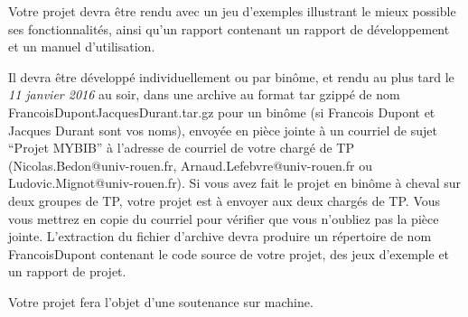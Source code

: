 \documentclass[10pt,a4wide,draft]{article}
\begin{document}
Votre projet devra être rendu avec un jeu d'exemples illustrant le mieux possible ses fonctionnalités, ainsi qu'un rapport contenant un rapport de développement et un manuel d'utilisation.

Il devra être développé individuellement ou par binôme, et rendu au plus tard le \emph{11 janvier 2016} au soir, dans une archive au format tar gzippé de nom FrancoisDupontJacquesDurant.tar.gz pour un binôme (si Francois Dupont et Jacques Durant sont vos noms), envoyée en pièce jointe à un courriel de sujet ``Projet MYBIB'' à l'adresse de courriel de votre chargé de TP (Nicolas.Bedon@univ-rouen.fr, Arnaud.Lefebvre@univ-rouen.fr ou Ludovic.Mignot@univ-rouen.fr). Si vous avez fait le projet en binôme à cheval sur deux groupes de TP, votre projet est à envoyer aux deux chargés de TP. Vous vous mettrez en copie du courriel pour vérifier que vous n'oubliez pas la pièce jointe. L'extraction du fichier d'archive devra produire un répertoire de nom FrancoisDupont contenant le code source de votre projet, des jeux d'exemple et un rapport de projet.

Votre projet fera l'objet d'une soutenance sur machine.



\nocite{BM:2015}
 

\end{document}

